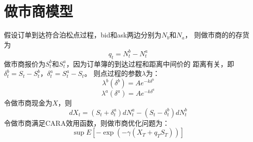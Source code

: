 \chapter{做市商模型}
假设订单到达符合泊松点过程，bid和ask两边分别为$N_b$和$N_a$，
则做市商的的存货为
$$q_t = N_t^b - N_t^a $$
做市商报价为$S_t^b$和$S_t^a$，因为订单簿的到达过程和距离中间价的
距离有关，即$\delta_t^b = S_t - S_t^b$，$\delta_t^a = S_t^a - S_t$。
则点过程的参数$\lambda$为：
$$\lambda^b(\delta^b) = A e^{-k \delta^b}$$
$$\lambda^a(\delta^a) = A e^{-k \delta^a}$$
令做市商现金为$X$，则
$$dX_t = (S_t + \delta_t^a)dN_t^a - (S_t-\delta_t^b)dN_t^b$$
令做市商满足CARA效用函数，则做市商优化问题为：
$$\sup E[-\exp(-\gamma(X_T+q_TS_T))]$$